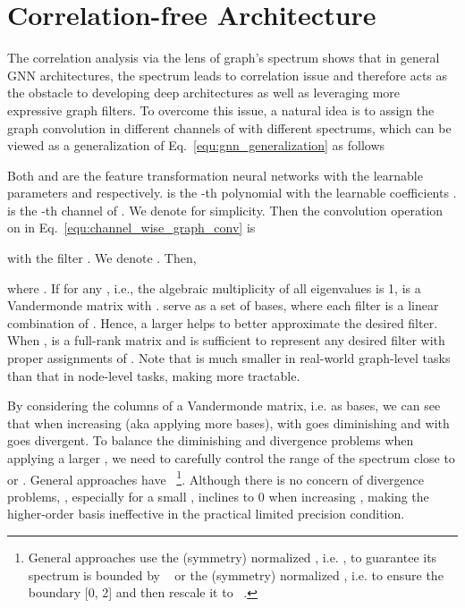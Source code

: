 \documentclass[nohyperref]{article}
\theoremstyle{plain}
\theoremstyle{definition}
\theoremstyle{remark}
\begin{document}
\section{Correlation-free Architecture}
\label{sec:channel_wise_architecture}

The correlation analysis via the lens of graph's spectrum shows that in general GNN architectures, the  spectrum leads to correlation issue and therefore acts as the obstacle to developing deep architectures as well as leveraging more expressive graph filters.
To overcome this issue, a natural idea is to assign the graph convolution in different channels of  with different spectrums, which can be viewed as a generalization of Eq.~\ref{equ:gnn_generalization} as follows

Both  and  are the feature transformation neural networks with the learnable parameters  and  respectively.
 is the -th polynomial with the learnable coefficients .
 is the -th channel of .
We denote  for simplicity.
Then the convolution operation on  in Eq.~\ref{equ:channel_wise_graph_conv} is

with the filter .
We denote .
Then,

where .
If  for any , i.e., the algebraic multiplicity of all eigenvalues is 1,  is a Vandermonde matrix with .
 serve as a set of  bases, where each filter  is a linear combination of .
Hence, a larger  helps to better approximate the desired filter.
When ,  is a full-rank matrix and  is sufficient to represent any desired filter with proper assignments of .
Note that  is much smaller in real-world graph-level tasks than that in node-level tasks, making  more tractable.

By considering the columns of a Vandermonde matrix, i.e.  as bases, we can see that when increasing  (aka applying more bases),  with  goes diminishing and  with  goes divergent.
To balance the diminishing and divergence problems when applying a larger , we need to carefully control the range of the spectrum close to  or .
General approaches have ~\footnote{General approaches use the (symmetry) normalized , i.e. ,  to guarantee its spectrum is bounded by ~\cite{kipf2017semi,klicpera2019diffusion} or the (symmetry) normalized , i.e.  to ensure the boundary [0, 2] and then rescale it to ~\cite{he2021bernnet}.}.
Although there is no concern of divergence problems, , especially for a small , inclines to 0 when increasing ,
making the higher-order basis ineffective in the practical limited precision condition.
\end{document}

